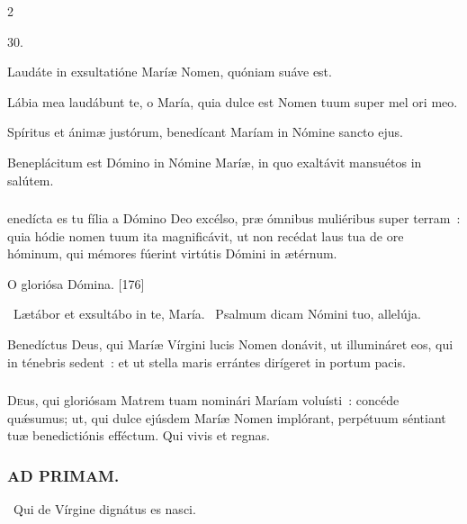 \documentclass[9pt,twoside]{extarticle}
\begin{document}
\begin{multicols}{2}
\begin{tightlist}{}
\item {} 30.
\item {} Laudáte in exsultatióne Maríæ Nomen, quóniam suáve est.
\item {} Lábia mea laudábunt te, o María, quia dulce est Nomen tuum super mel ori meo.
\item {} Spíritus et ánimæ justórum, benedícant Maríam in Nómine sancto ejus.
\item {} Beneplácitum est Dómino in Nómine Maríæ, in quo exaltávit mansuétos in salútem.
\end{tightlist}

\subsubsection*{}
enedícta es tu fília a Dómino Deo excélso, præ ómnibus muliéribus super terram~: quia hódie nomen tuum ita magnificávit, ut non recédat laus tua de ore hóminum, qui mémores fúerint virtútis Dómini in ætérnum.

\begin{tightlist}{}
\item {} O gloriósa Dómina. [176]
\item {}~Lætábor et exsultábo in te, María. ~Psalmum dicam Nómini tuo, allelúja.
\item {} Benedíctus Deus, qui Maríæ Vírgini lucis Nomen donávit, ut illumináret eos, qui in ténebris sedent~: et ut stella maris errántes dirígeret in portum pacis.
\end{tightlist}

\subsubsection*{\center {}}
\lettrine{D}eus, qui gloriósam Matrem tuam nominári Maríam voluísti~: concéde quǽsumus; ut, qui dulce ejúsdem Maríæ Nomen implórant, perpétuum séntiant tuæ benedictiónis efféctum. Qui vivis et regnas.

\subsubsection*{\center \textsc{AD PRIMAM.}}
\begin{tightlist}{}
\item {}
\item {}~Qui de Vírgine dignátus es nasci.
\end{tightlist}


\end{multicols}
\end{document}
